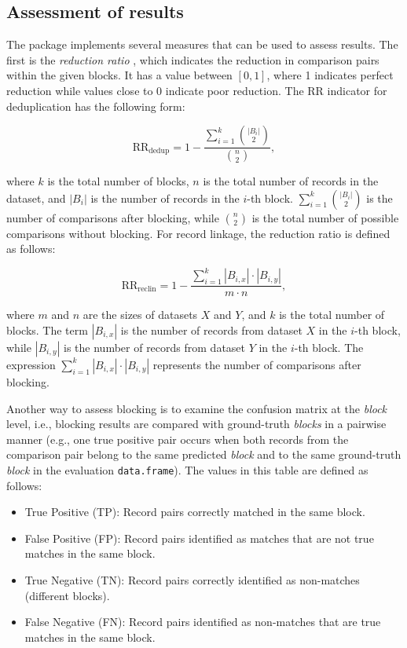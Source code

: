 \subsection{Assessment of results}\label{sec-assess}

The package implements several measures that can be used to assess
results. The first is the \emph{reduction ratio} \citep[RR, cf.~][]{christen2007quality}, which indicates the
reduction in comparison pairs within the given blocks. It has a value
between \([0,1]\), where 1 indicates perfect reduction while values close
to 0 indicate poor reduction. The RR indicator for deduplication has the
following form:

\[
\text{RR}_{\text{dedup}} = 1 - \frac{\sum\limits_{i=1}^{k} \binom{|B_i|}{2}}{\binom{n}{2}},
\]

\noindent where \(k\) is the total number of blocks, \(n\) is the total
number of records in the dataset, and \(|B_i|\) is the number of records
in the \(i\)-th block. \(\sum\limits_{i=1}^{k} \binom{|B_i|}{2}\) is the
number of comparisons after blocking, while \(\binom{n}{2}\) is the total
number of possible comparisons without blocking. For record linkage, the
reduction ratio is defined as follows:

\[
\text{RR}_{\text{reclin}} = 1 - \frac{\sum\limits_{i=1}^{k} |B_{i,x}| \cdot |B_{i,y}|} {m \cdot n},
\]

\noindent where \(m\) and \(n\) are the sizes of datasets \(X\) and \(Y\), and
\(k\) is the total number of blocks. The term \(|B_{i,x}|\) is the number of
records from dataset \(X\) in the \(i\)-th block, while \(|B_{i,y}|\) is the
number of records from dataset \(Y\) in the \(i\)-th block. The expression
\(\sum\limits_{i=1}^{k} |B_{i,x}| \cdot |B_{i,y}|\) represents the number
of comparisons after blocking.

Another way to assess blocking is to examine the confusion matrix at the
\emph{block} level, i.e., blocking results are compared with ground-truth
\emph{blocks} in a pairwise manner (e.g., one true positive pair occurs when
both records from the comparison pair belong to the same predicted
\emph{block} and to the same ground-truth \emph{block} in the evaluation
\texttt{data.frame}). The values in this table are defined as follows:

\begin{itemize}
\tightlist
\item
  True Positive (TP): Record pairs correctly matched in the same
  block.
\item
  False Positive (FP): Record pairs identified as matches that are not
  true matches in the same block.
\item
  True Negative (TN): Record pairs correctly identified as non-matches
  (different blocks).
\item
  False Negative (FN): Record pairs identified as non-matches that are
  true matches in the same block.
\end{itemize}

